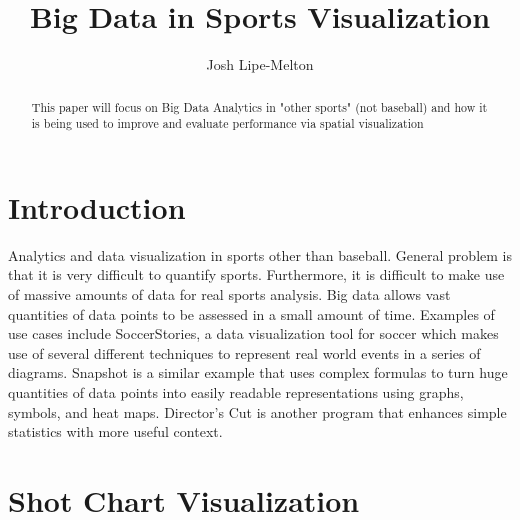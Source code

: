 \documentclass[sigconf]{acmart}
\begin{document}
\title{Big Data in Sports Visualization}


\author{Josh Lipe-Melton}

\renewcommand{\shortauthors}{J. Lipe-Melton}


\begin{abstract}
This paper will focus on Big Data Analytics in "other sports" (not baseball) and how it is being used to improve and evaluate performance via spatial visualization
\end{abstract}



\maketitle




\section{Introduction} 

Analytics and data visualization in sports other than baseball. General problem is that it is very difficult to quantify sports. Furthermore, it is difficult to make use of massive amounts of data for real sports analysis. Big data allows vast quantities of data points to be assessed in a small amount of time. Examples of use cases include SoccerStories, a data visualization tool for soccer which makes use of several different techniques to represent real world events in a series of diagrams. Snapshot is a similar example that uses complex formulas to turn huge quantities of data points into easily readable representations using graphs, symbols, and heat maps. Director’s Cut is another program that enhances simple statistics with more useful context.

\section{Shot Chart Visualization}
\end{document}
